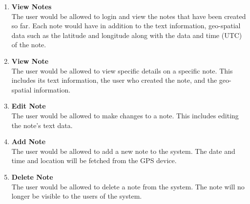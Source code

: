 \begin{enumerate}
	\item \textbf{View Notes}\\
	The user would be allowed to login and view the notes that have been created so far. Each note would have in addition to the text information, geo-spatial data such as the latitude and longitude along with the data and time (UTC) of the note.
	
	\item \textbf{View Note}\\
	The user would be allowed to view specific details on a specific note. This includes its text information, the user who created the note, and the geo-spatial information.
	
	\item \textbf{Edit Note}\\
	The user would be allowed to make changes to a note. This includes editing the note's text data.
	
	\item \textbf{Add Note}\\
	The user would be allowed to add a new note to the system. The date and time and location will be fetched from the GPS device.
	
	\item \textbf{Delete Note}\\
	The user would be allowed to delete a note from the system. The note will no longer be visible to the users of the system.
	
\end{enumerate}
